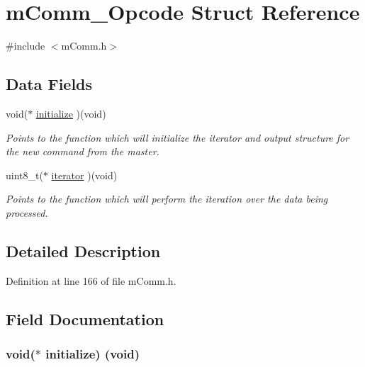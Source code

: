 \hypertarget{structm_comm___opcode}{}\section{m\+Comm\+\_\+\+Opcode Struct Reference}
\label{structm_comm___opcode}


{\ttfamily \#include $<$m\+Comm.\+h$>$}

\subsection*{Data Fields}
\begin{DoxyCompactItemize}
\item 
void($\ast$ \hyperlink{structm_comm___opcode_a58f6369cdaeb8b436a3b3a02509463de}{initialize} )(void)
\begin{DoxyCompactList}\small\item\em Points to the function which will initialize the iterator and output structure for the new command from the master. \end{DoxyCompactList}\item 
uint8\+\_\+t($\ast$ \hyperlink{structm_comm___opcode_a6995b26b309317115ab75caad4adcf1d}{iterator} )(void)
\begin{DoxyCompactList}\small\item\em Points to the function which will perform the iteration over the data being processed. \end{DoxyCompactList}\end{DoxyCompactItemize}


\subsection{Detailed Description}


Definition at line 166 of file m\+Comm.\+h.



\subsection{Field Documentation}
\hypertarget{structm_comm___opcode_a58f6369cdaeb8b436a3b3a02509463de}{}
\subsubsection[{initialize}]{\setlength{\rightskip}{0pt plus 5cm}void($\ast$ initialize) (void)}\label{structm_comm___opcode_a58f6369cdaeb8b436a3b3a02509463de}


